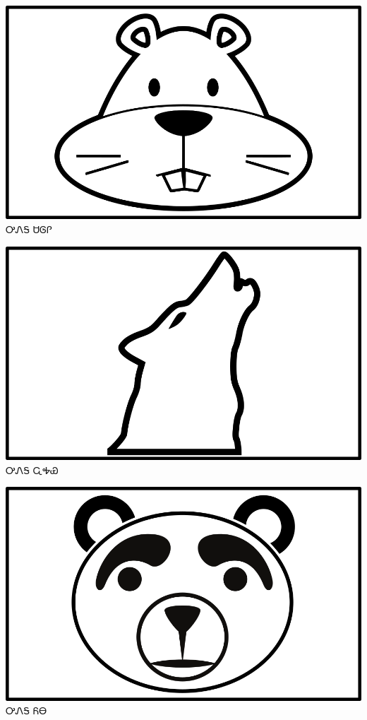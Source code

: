 \documentclass[avery5371]{flashcards}%
\begin{document}
\begin{flashcard}{
\includegraphics[width=0.95\columnwidth,height=.51\columnwidth,keepaspectratio]{../artwork/objects-animate/saloli}
}\Huge ᎤᏁᎦ ᏌᎶᎵ
\end{flashcard}

\begin{flashcard}{
\includegraphics[width=0.95\columnwidth,height=.51\columnwidth,keepaspectratio]{../artwork/objects-animate/wahya}
}\Huge ᎤᏁᎦ ᏩᎭᏯ
\end{flashcard}

\begin{flashcard}{
\includegraphics[width=0.95\columnwidth,height=.51\columnwidth,keepaspectratio]{../artwork/objects-animate/yona}
}\Huge ᎤᏁᎦ ᏲᎾ
\end{flashcard}
\end{document}

